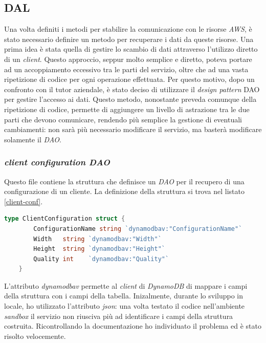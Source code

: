 \subsection{DAL}

Una volta definiti i metodi per stabilire la comunicazione con le risorse
\emph{AWS}, è stato necessario definire un metodo per recuperare i dati da
queste risorse. Una prima idea è stata quella di gestire lo scambio di dati
attraverso l'utilizzo diretto di un \emph{client}. Questo approccio, seppur
molto semplice e diretto, poteva portare ad un accoppiamento eccessivo tra le
parti del servizio, oltre che ad una vasta ripetizione di codice per ogni
operazione effettuata. Per questo motivo, dopo un confronto con il tutor
aziendale, è stato deciso di utilizzare il \emph{design pattern} \glsfirstoccur\gls{DAO} per
gestire l'accesso ai dati. Questo metodo, nonostante preveda comunque della
ripetizione di codice, permette di aggiungere un livello di astrazione tra le
due parti che devono comunicare, rendendo più semplice la gestione di eventuali
cambiamenti: non sarà più necessario modificare il servizio, ma basterà
modificare solamente il \emph{DAO}.

\subsubsection{\emph{client configuration DAO}}

Questo file contiene la struttura che definisce un \emph{DAO} per il recupero di
una configurazione di un cliente. La definizione della struttura si trova nel listato \ref{client-conf}.
\begin{lstlisting}[label=client-conf, caption={Struttura di una configurazione di un cliente},captionpos=b, language=go]
type ClientConfiguration struct {
        ConfigurationName string `dynamodbav:"ConfigurationName"`
        Width   string `dynamodbav:"Width"`
        Height  string `dynamodbav:"Height"`
        Quality int    `dynamodbav:"Quality"`
    }
\end{lstlisting}
L'attributo \emph{dynamodbav} permette al \emph{client} di \emph{DynamoDB} di
mappare i campi della struttura con i campi della tabella. Inizalmente, durante
lo sviluppo in locale, ho utilizzato l'attributo \emph{json}: una volta testato
il codice nell'ambiente \emph{sandbox} il servizio non riusciva più ad
identificare i campi della struttura costruita. Ricontrollando la documentazione
ho individuato il problema ed è stato risolto velocemente.

